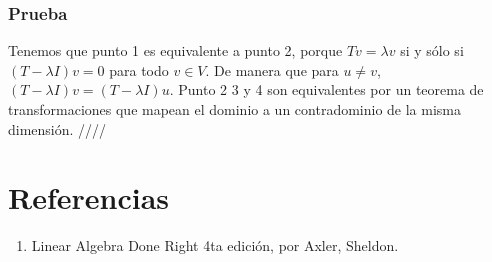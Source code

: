 \documentclass{article}
\begin{document}
 \subsubsection*{Prueba}
 Tenemos que punto 1 es equivalente a punto 2, porque
 $Tv=\lambda v$ si y sólo si $(T-\lambda I)v = 0$ para todo
 $v\in V$. De manera que para $u\neq v$, $(T-\lambda I)v =
 (T-\lambda I)u$. Punto 2 3 y 4 son equivalentes por
 un teorema de transformaciones que mapean el dominio
 a un contradominio de la misma dimensión.
 \hfill ////

\newpage
\section*{Referencias}
\begin{enumerate}
    \item Linear Algebra Done Right 4ta edición, por Axler, Sheldon.
\end{enumerate}
\end{document}
